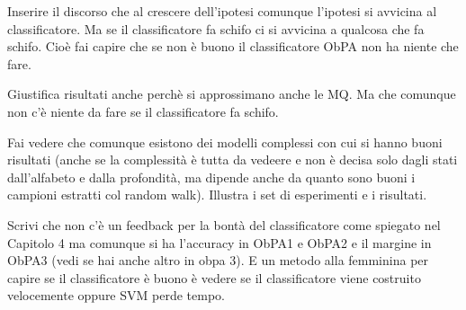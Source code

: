 Inserire il discorso che al crescere dell'ipotesi comunque l'ipotesi si avvicina al classificatore. Ma se il classificatore fa schifo ci si avvicina a qualcosa che fa schifo. Cioè fai capire che se non è buono il classificatore ObPA non ha niente che fare.

Giustifica risultati anche perchè si approssimano anche le MQ. Ma che comunque non c'è niente da fare se il classificatore fa schifo.



Fai vedere che comunque esistono dei modelli complessi con cui si hanno buoni risultati (anche se la complessità è tutta da vedeere e non è decisa solo dagli stati dall'alfabeto e dalla profondità, ma dipende anche da quanto sono buoni i campioni estratti col random walk).
Illustra i set di esperimenti e i risultati.

Scrivi che non c'è un feedback per la bontà del classificatore come spiegato nel Capitolo 4 ma comunque si ha l'accuracy in ObPA1 e ObPA2 e il margine in ObPA3 (vedi se hai anche altro in obpa 3). E un metodo alla femminina per capire se il classificatore è buono è vedere se il classificatore viene costruito velocemente oppure SVM perde tempo. 